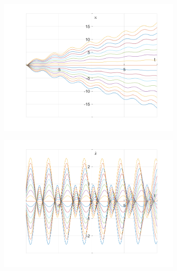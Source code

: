 \documentclass{article}
\begin{document}
	\begin{figure}[h!]
		\centering
		\begin{subfigure}[b]{0.48\linewidth}
			\includegraphics[width=\linewidth]{./SmallOscillations/S12/F3.png}
		\end{subfigure}
		\begin{subfigure}[b]{0.48\linewidth}
			\includegraphics[width=\linewidth]{./SmallOscillations/S12/F4.png}
		\end{subfigure}
	\end{figure}
\end{document}
